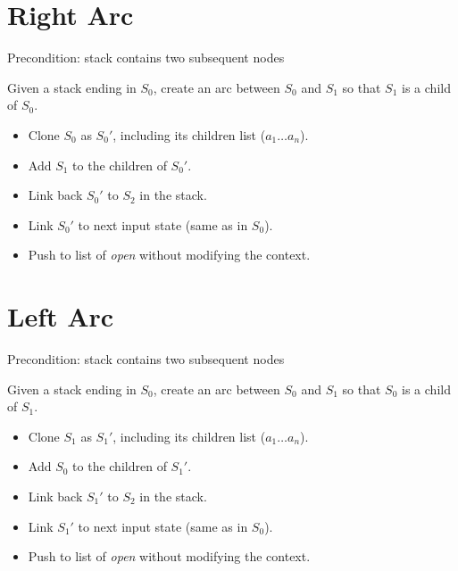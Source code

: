\documentclass{article}
\begin{document}
\section{Right Arc}

Precondition: stack contains two subsequent nodes

Given a stack ending in $S_0$, create an arc between $S_0$ and $S_1$ so that $S_1$ is a child of $S_0$.
\begin{itemize}
\item Clone $S_0$ as $S_0'$, including its children list ($a_1 \dots a_n$).
\item Add $S_1$ to the children of $S_0'$.
\item Link back $S_0'$ to $S_2$ in the stack.
\item Link $S_0'$ to next input state (same as in $S_0$).
\item Push to list of {\it open} without modifying the context.
\end{itemize}


\section{Left Arc}

Precondition: stack contains two subsequent nodes

Given a stack ending in $S_0$, create an arc between $S_0$ and $S_1$ so that $S_0$ is a child of $S_1$.
\begin{itemize}
\item Clone $S_1$ as $S_1'$, including its children list ($a_1 \dots a_n$).
\item Add $S_0$ to the children of $S_1'$.
\item Link back $S_1'$ to $S_2$ in the stack.
\item Link $S_1'$ to next input state (same as in $S_0$).
\item Push to list of {\it open} without modifying the context.
\end{itemize}
\end{document}
